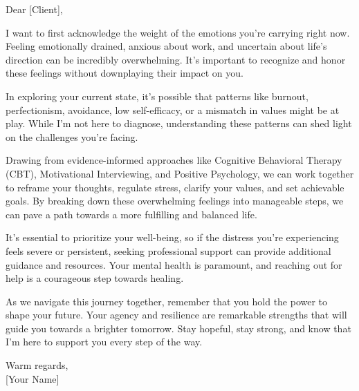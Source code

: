 \newpage

\begin{tcolorbox}[outputbox ds={DeepSeek-V3.1 (Rank 10 augmentation) Run 1}]
\small
Dear [Client],

I want to first acknowledge the weight of the emotions you're carrying right now. Feeling emotionally drained, anxious about work, and uncertain about life's direction can be incredibly overwhelming. It's important to recognize and honor these feelings without downplaying their impact on you.

In exploring your current state, it's possible that patterns like burnout, perfectionism, avoidance, low self-efficacy, or a mismatch in values might be at play. While I'm not here to diagnose, understanding these patterns can shed light on the challenges you're facing.

Drawing from evidence-informed approaches like Cognitive Behavioral Therapy (CBT), Motivational Interviewing, and Positive Psychology, we can work together to reframe your thoughts, regulate stress, clarify your values, and set achievable goals. By breaking down these overwhelming feelings into manageable steps, we can pave a path towards a more fulfilling and balanced life.

It's essential to prioritize your well-being, so if the distress you're experiencing feels severe or persistent, seeking professional support can provide additional guidance and resources. Your mental health is paramount, and reaching out for help is a courageous step towards healing.

As we navigate this journey together, remember that you hold the power to shape your future. Your agency and resilience are remarkable strengths that will guide you towards a brighter tomorrow. Stay hopeful, stay strong, and know that I'm here to support you every step of the way.

\medskip
Warm regards,\\
{[Your Name]}
\end{tcolorbox}
